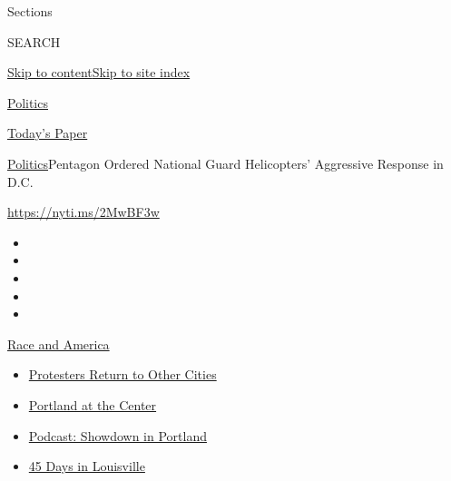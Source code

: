 Sections

SEARCH

\protect\hyperlink{site-content}{Skip to
content}\protect\hyperlink{site-index}{Skip to site index}

\href{https://www.nytimes.com/section/politics}{Politics}

\href{https://myaccount.nytimes.com/auth/login?response_type=cookie\&client_id=vi}{}

\href{https://www.nytimes.com/section/todayspaper}{Today's Paper}

\href{/section/politics}{Politics}\textbar{}Pentagon Ordered National
Guard Helicopters' Aggressive Response in D.C.

\url{https://nyti.ms/2MwBF3w}

\begin{itemize}
\item
\item
\item
\item
\item
\end{itemize}

\href{https://www.nytimes.com/news-event/george-floyd-protests-minneapolis-new-york-los-angeles?action=click\&pgtype=Article\&state=default\&region=TOP_BANNER\&context=storylines_menu}{Race
and America}

\begin{itemize}
\tightlist
\item
  \href{https://www.nytimes.com/2020/07/26/us/protests-portland-seattle-trump.html?action=click\&pgtype=Article\&state=default\&region=TOP_BANNER\&context=storylines_menu}{Protesters
  Return to Other Cities}
\item
  \href{https://www.nytimes.com/2020/07/24/us/portland-oregon-protests-white-race.html?action=click\&pgtype=Article\&state=default\&region=TOP_BANNER\&context=storylines_menu}{Portland
  at the Center}
\item
  \href{https://www.nytimes.com/2020/07/23/podcasts/the-daily/portland-protests.html?action=click\&pgtype=Article\&state=default\&region=TOP_BANNER\&context=storylines_menu}{Podcast:
  Showdown in Portland}
\item
  \href{https://www.nytimes.com/interactive/2020/07/16/us/black-lives-matter-protests-louisville-breonna-taylor.html?action=click\&pgtype=Article\&state=default\&region=TOP_BANNER\&context=storylines_menu}{45
  Days in Louisville}
\end{itemize}

